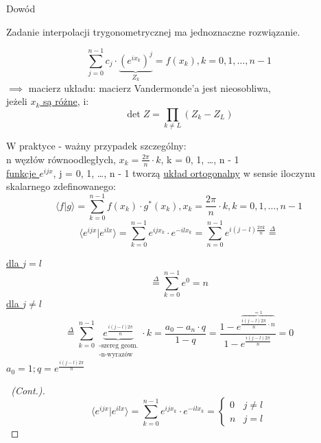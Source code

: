 \begin{frame}[allowframebreaks]{Dowód}
	\begin{theorem}
		Zadanie interpolacji trygonometrycznej ma jednoznaczne rozwiązanie.
	\end{theorem}
	\begin{proofs}
		\[
			\sum\limits_{j = 0}^{n-1} c_j \cdot \underbrace{(e^{ix_k})^j}_{Z_k} = f(x_k), k = 0, 1, \dots, n-1
			\tag{16.13}
		\]
		$\implies$ macierz układu: macierz Vandermonde'a jest nieosobliwa, \\ jeżeli \underline{$x_k$ są różne}, i:
		\[
			\det Z = \prod_{k \neq L} (Z_k - Z_L)
			\tag{16.14}
		\]
	\end{proofs}
	\begin{proofs}
		W praktyce - ważny przypadek szczególny: \\
		n węzłów równoodległych, \underline{$x_k = \frac{2\pi}{n}\cdot k$}, k = 0, 1, \dots, n - 1 \\
		\underline{funkcje $e^{ijx}$}, j = 0, 1, \dots, n - 1 tworzą \underline{układ ortogonalny} w sensie iloczynu skalarnego zdefinowanego: \\
		\[
			\langle f|g \rangle = \sum\limits_{k = 0}^{n-1} f(x_k) \cdot g^* (x_k), x_k = \frac{2\pi}{n} \cdot k, k = 0, 1, \dots, n-1
			\tag{16.15}
		\]
		\[
			\langle e^{ijx}|e^{ilx} \rangle = \sum\limits_{k = 0}^{n-1} e^{ijx_k}  \cdot e^{-ilx_k} = \sum\limits_{n = 0}^{n-1} e^{i(j - l) \frac{2\pi k}{n}}\stackrel{\Delta}{=}
			\tag{16.16}
		\]
	\end{proofs}
	\begin{proofs}
		\underline{dla $j = l$}
		\[
			\stackrel{\Delta}{=} \sum\limits_{k = 0}^{n-1} e^0 = n
			\tag{16.17}
		\]
		\underline{dla $j \neq l$}
		\[
			\stackrel{\Delta}{=} \sum\limits_{k = 0}^{n-1} \underbrace{e^{\frac{i(j - l)2\pi}{n}}}_{\substack{
				\text{-szereg geom.} \\
				\text{-n-wyrazów}
			}} \cdot k = \frac{a_0 - a_n \cdot q}{1 - q} = \frac{1 - e ^{\overbrace{\frac{i(j - l)2\pi}{n} \cdot n}^{=1}}}{1 - e^{\frac{i(j -  l)2\pi}{n}}} = 0
			\tag{16.18}
		\]
		$a_0 = 1; q = e^{\frac{i(j -  l)2\pi}{n}}$
	\end{proofs}
	\begin{proof}[\proofname\ (Cont.)]
		\[
			\langle e^{ijx}|e^{ilx} \rangle = \sum\limits_{k = 0}^{n - 1}e^{ijx_k}  \cdot e^{-ilx_k} = 
			\begin{cases}
				0 & j \neq l \\
				n & j = l
			\end{cases}
			\tag{16.19}
		\]
	\end{proof}
\end{frame}
